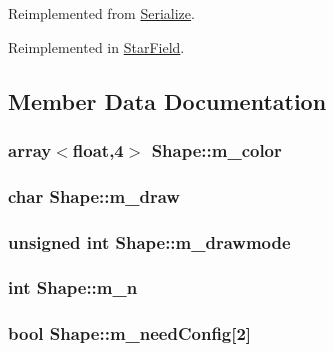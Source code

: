 Reimplemented from \hyperlink{classSerialize_ac94a76de6c9376e33b4c195d50ff0568}{Serialize}.



Reimplemented in \hyperlink{classStarField_a047f987e052fc14fd8041658c153e0f1}{Star\-Field}.



\subsection{Member Data Documentation}
\hypertarget{classShape_a41389fbe5746a93b075acc98e485582c}{
\subsubsection[{m\-\_\-color}]{\setlength{\rightskip}{0pt plus 5cm}array$<$float,4$>$ Shape\-::m\-\_\-color}}\label{classShape_a41389fbe5746a93b075acc98e485582c}
\hypertarget{classShape_a35589131828091da1fe3717f48e9c664}{
\subsubsection[{m\-\_\-draw}]{\setlength{\rightskip}{0pt plus 5cm}char Shape\-::m\-\_\-draw}}\label{classShape_a35589131828091da1fe3717f48e9c664}
\hypertarget{classShape_a3cf20a9158443fa941b4e85a7b817816}{
\subsubsection[{m\-\_\-drawmode}]{\setlength{\rightskip}{0pt plus 5cm}unsigned int Shape\-::m\-\_\-drawmode}}\label{classShape_a3cf20a9158443fa941b4e85a7b817816}
\hypertarget{classShape_a14a1994dd7d7fc412b18d3ad2563556d}{
\subsubsection[{m\-\_\-n}]{\setlength{\rightskip}{0pt plus 5cm}int Shape\-::m\-\_\-n}}\label{classShape_a14a1994dd7d7fc412b18d3ad2563556d}
\hypertarget{classShape_ac96ad62fd8b979f9a1e92b211922bb25}{
\subsubsection[{m\-\_\-need\-Config}]{\setlength{\rightskip}{0pt plus 5cm}bool Shape\-::m\-\_\-need\-Config\mbox{[}2\mbox{]}}}\label{classShape_ac96ad62fd8b979f9a1e92b211922bb25}
